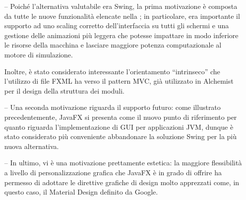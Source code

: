         \begin{itemize}
            \item[--]
                Poiché l'alternativa valutabile era Swing, la prima motivazione è composta da tutte le nuove funzionalità elencate nella ;
                in particolare, era importante il supporto ad uno scaling corretto dell'interfaccia su tutti gli schermi e una gestione delle animazioni più leggera che potesse impattare in modo inferiore le risorse della macchina e lasciare maggiore potenza computazionale al motore di simulazione.

                Inoltre, è stato considerato interessante l'orientamento ``intrinseco'' che l'utilizzo di file FXML ha verso il pattern MVC, già utilizzato in Alchemist per il design della struttura dei moduli.

            \item[--]
                Una seconda motivazione riguarda il supporto futuro:
                come illustrato precedentemente, JavaFX si presenta come il nuovo punto di riferimento per quanto riguarda l'implementazione di GUI per applicazioni JVM, dunque è stato considerato più conveniente abbandonare la soluzione  Swing per la più nuova alternativa.

            \item[--]
                In ultimo, vi è una motivazione prettamente estetica:
                la maggiore flessibilità a livello di personalizzazione grafica che JavaFX è in grado di offrire ha permesso di adottare le direttive grafiche di design molto apprezzati come, in questo caso, il Material Design definito da Google.
        \end{itemize}
